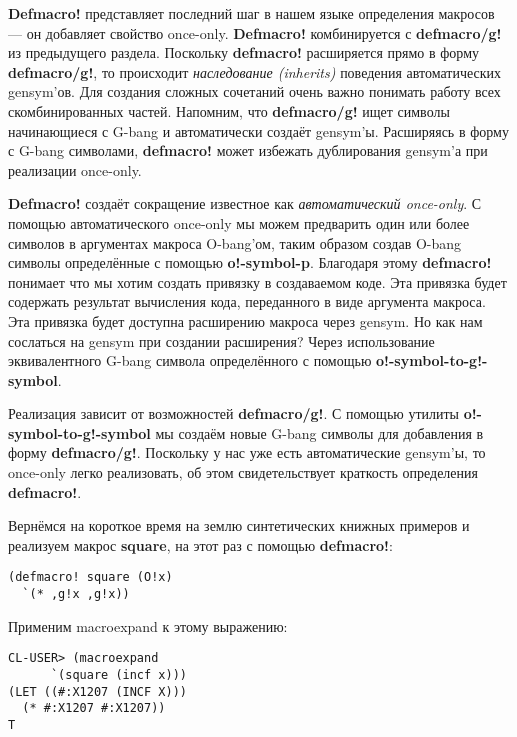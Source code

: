 \textbf{Defmacro!} представляет последний шаг в нашем языке определения макросов --- он добавляет свойство once-only. \textbf{Defmacro!} комбинируется с \textbf{defmacro/g!} из предыдущего раздела. Поскольку \textbf{defmacro!} расширяется прямо в форму \textbf{defmacro/g!}, то происходит \emph{наследование (inherits)} поведения автоматических gensym'ов. Для создания сложных сочетаний очень важно понимать работу всех скомбинированных частей. Напомним, что \textbf{defmacro/g!} ищет символы начинающиеся с G-bang и автоматически создаёт gensym'ы. Расширяясь в форму с G-bang символами, \textbf{defmacro!} может избежать дублирования gensym'а при реализации once-only.

\textbf{Defmacro!} создаёт сокращение известное как \emph{автоматический once-only}. С помощью автоматического once-only мы можем предварить один или более символов в аргументах макроса O-bang'ом, таким образом создав O-bang символы определённые с помощью \textbf{o!-symbol-p}. Благодаря этому \textbf{defmacro!} понимает что мы хотим создать привязку в создаваемом коде. Эта привязка будет содержать результат вычисления кода, переданного в виде аргумента макроса. Эта привязка будет доступна расширению макроса через gensym. Но как нам сослаться на gensym при создании расширения? Через использование эквивалентного G-bang символа определённого с помощью \textbf{o!-symbol-to-g!-symbol}.

Реализация зависит от возможностей \textbf{defmacro/g!}. С помощью утилиты \textbf{o!-symbol-to-g!-symbol} мы создаём новые G-bang символы для добавления в форму \textbf{defmacro/g!}. Поскольку у нас уже есть автоматические gensym'ы, то once-only легко реализовать, об этом свидетельствует краткость определения \textbf{defmacro!}.

Вернёмся на короткое время на землю синтетических книжных примеров и реализуем макрос \textbf{square}, на этот раз с помощью \textbf{defmacro!}:

\begin{verbatim}
(defmacro! square (O!x)
  `(* ,g!x ,g!x))
\end{verbatim}

Применим macroexpand к этому выражению:

\begin{verbatim}
CL-USER> (macroexpand
	  `(square (incf x)))
(LET ((#:X1207 (INCF X)))
  (* #:X1207 #:X1207))
T
\end{verbatim}

